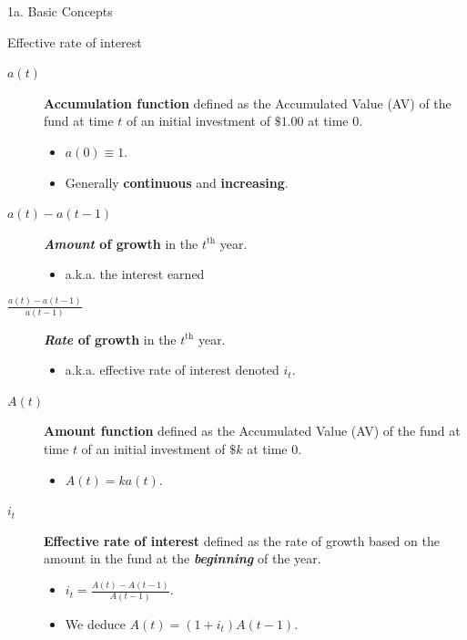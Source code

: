 \begin{CHPT_SUMM_AUTO}[label = {L.-1a}]{1a. Basic Concepts}
\begin{FORMULA_SUMM}{Effective rate of interest}
\begin{description}
	\item[$a(t)$]	\textbf{Accumulation function} defined as the Accumulated Value (AV) of the fund at time $t$ of an initial investment of $\$1.00$ at time 0.
		\begin{itemize}[leftmargin = *]
		\item	$a(0) \equiv 1$.
		\item	Generally \textbf{continuous} and \textbf{increasing}.
		\end{itemize}
	\item[$a(t) - a(t - 1)$]	\textbf{\textit{Amount} of growth} in the $t^{\text{th}}$ year.
		\begin{itemize}[leftmargin = *]
		\item	a.k.a. the interest earned
		\end{itemize}
	\item[$\frac{a(t) - a(t - 1)}{a(t - 1)}$]	\textbf{\textit{Rate} of growth} in the $t^{\text{th}}$ year.
		\begin{itemize}[leftmargin = *]
		\item	a.k.a. effective rate of interest denoted $i_{t}$.
		\end{itemize}
	\item[$A(t)$]	\textbf{Amount function} defined as the Accumulated Value (AV) of the fund at time $t$ of an initial investment of $\$k$ at time 0.
		\begin{itemize}[leftmargin = *]
		\item	$A(t) = k a(t)$.
		\end{itemize}
	\item[$i_{t}$]	\textbf{Effective rate of interest} defined as the rate of growth based on the amount in the fund at the \textbf{\textit{beginning}} of the year.
		\begin{itemize}[leftmargin = *]
		\item	$i_{t} = \frac{A(t) - A(t - 1)}{A(t - 1)}$.
		\item	We deduce $A(t) = (1 + i_{t})A(t - 1)$.
		\end{itemize}
\end{description}
\end{FORMULA_SUMM}


\end{CHPT_SUMM_AUTO}
